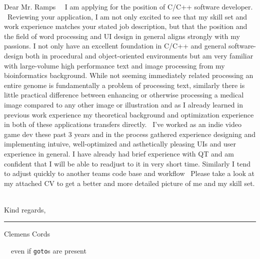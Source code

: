 \documentclass[11pt]{article}
\newcommand{\muted}{\color{muted_grey}}
\newcommand{\emptyline}{\,\newline}
\begin{document}
\begin{flushleft}
Dear Mr. Ramps
\emptyline
\emptyline
I am applying for the position of C/C++ software developer.\linebreak
\emptyline
Reviewing your application, I am not only excited to see that my skill set and work experience matches your stated job description, but that the position and the field of word processing and UI design in general aligns strongly with my passions.\linebreak
I not only have an excellent foundation in C/C++ and general software-design both in procedural and object-oriented environments but am very familiar with large-volume high performance text and image processing from my bioinformatics background.
While not seeming immediately related processing an entire genome is fundamentally a problem of processing text,
similarly there is little practical difference between enhancing or otherwise processing a medical image compared to any other image or illustration and as I already learned in previous work experience my theoretical background and optimization experience in both of these applications transfers directly.\linebreak
\emptyline
I've worked as an indie video game dev these past 3 years and in the process gathered experience designing and implementing intuive, well-optimized and asthetically pleasing UIs and user experience in general.
I have already had brief experience with QT and am confident that I will be able to readjust to it in very short time.
Similarly I tend to adjust quickly to another teams code base{\muted\textasteriskcentered} and workflow
\emptyline
Please take a look at my attached CV to get a better and more detailed picture of me and my skill set.\linebreak
\emptyline

Kind regards,\newline
\emptyline
\emptyline
\emptyline
\emptyline

\rule[0pt]{30ex}{0.5pt}\newline
{\muted Clemens Cords}
\end{flushleft}

\begin{flushright}
\emptyline
\emptyline
{\small\color{light_grey}\textasteriskcentered \:even if \lstinline{goto}s are present}
\end{flushright}
\end{document}
